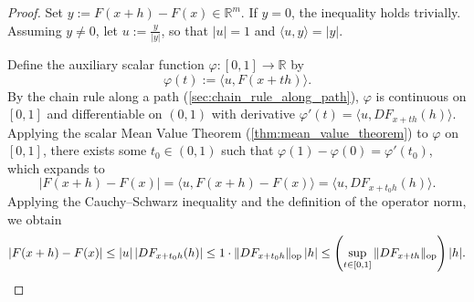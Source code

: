 \begin{proof}
Set $y := F(x+h) - F(x) \in \mathbb{R}^m$. If $y = 0$, the inequality holds trivially. Assuming $y \neq 0$, let $u := \frac{y}{|y|}$, so that $|u| = 1$ and $\langle u, y \rangle = |y|$.

Define the auxiliary scalar function $\varphi : [0,1] \to \mathbb{R}$ by
\[
\varphi(t) := \langle u, F(x+th) \rangle.
\]
By the chain rule along a path (\cref{sec:chain_rule_along_path}), $\varphi$ is continuous on $[0,1]$ and differentiable on $(0,1)$ with derivative $\varphi'(t) = \langle u, DF_{x+th}(h) \rangle$. Applying the scalar Mean Value Theorem (\cref{thm:mean_value_theorem}) to $\varphi$ on $[0,1]$, there exists some $t_0 \in (0,1)$ such that $\varphi(1) - \varphi(0) = \varphi'(t_0)$, which expands to
\[
|F(x+h) - F(x)| = \langle u, F(x+h) - F(x) \rangle = \langle u, DF_{x+t_0 h}(h) \rangle.
\]
Applying the Cauchy--Schwarz inequality and the definition of the operator norm, we obtain
\[
|F(x+h) - F(x)| \leq |u| \, |DF_{x+t_0 h}(h)| \leq 1 \cdot \|DF_{x+t_0 h}\|_{\mathrm{op}} \, |h| \leq \left( \sup_{t \in [0,1]} \|DF_{x+th}\|_{\mathrm{op}} \right) |h|. \qedhere
\]
\end{proof}

